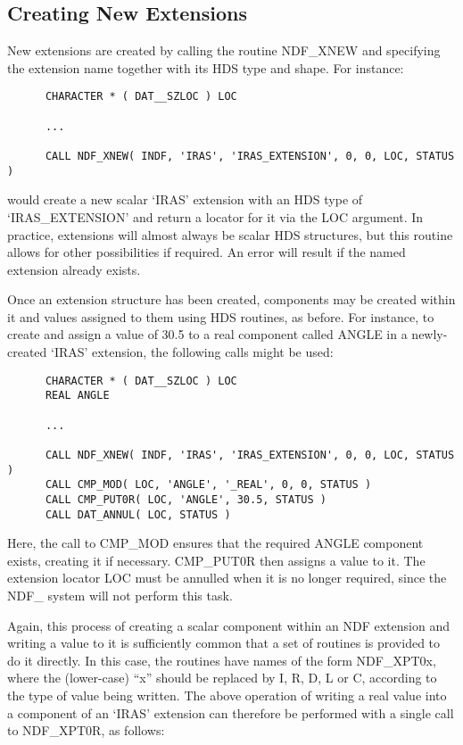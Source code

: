 \documentclass[twoside,11pt]{article}
\newcommand{\htmlref}[2]{#1}
\newcommand{\xref}[3]{#1}
\newcommand{\xlabel}[1]{}
\begin{document}
\subsection{\xlabel{creating_new_extensions}\label{ss:creatingnewextensions}Creating New Extensions}

New extensions are created by calling the routine \htmlref{NDF\_XNEW}{NDF_XNEW} and specifying
the extension name together with its \xref{HDS type and
shape}{sun92}{HDS_objects}.
For instance:

\small
\begin{verbatim}
      CHARACTER * ( DAT__SZLOC ) LOC

      ...

      CALL NDF_XNEW( INDF, 'IRAS', 'IRAS_EXTENSION', 0, 0, LOC, STATUS )
\end{verbatim}
\normalsize

would create a new scalar `IRAS' extension with an HDS type of
`IRAS\_EXTENSION' and return a \xref{locator}{sun92}{using_locators}
for it via the LOC argument.
In practice, extensions will almost always be scalar HDS structures, but
this routine allows for other possibilities if required. 
An error will result if the named extension already exists. 

Once an extension structure has been created, components may be created
within it and values assigned to them using \xref{HDS
routines}{sun92}{alphabetical_list_of_routines}, as before.
For instance, to create and assign a value of 30.5 to a real component
called ANGLE in a newly-created `IRAS' extension, the following calls might
be used: 

\small
\begin{verbatim}
      CHARACTER * ( DAT__SZLOC ) LOC
      REAL ANGLE

      ...

      CALL NDF_XNEW( INDF, 'IRAS', 'IRAS_EXTENSION', 0, 0, LOC, STATUS )
      CALL CMP_MOD( LOC, 'ANGLE', '_REAL', 0, 0, STATUS )
      CALL CMP_PUT0R( LOC, 'ANGLE', 30.5, STATUS )
      CALL DAT_ANNUL( LOC, STATUS )
\end{verbatim}
\normalsize

Here, the call to \xref{CMP\_MOD}{sun92}{CMP_MOD} ensures that the
required ANGLE component exists, creating it if necessary.
\xref{CMP\_PUT0R}{sun92}{CMP_PUT0x} then assigns a value to it. 
The extension locator LOC must be annulled when it is no longer required,
since the NDF\_ system will not perform this task. 

Again, this process of creating a scalar component within an NDF extension
and writing a value to it is sufficiently common that a set of routines is
provided to do it directly. 
In this case, the routines have names of the form \htmlref{NDF\_XPT0x}{NDF_XPT0x}, where the
(lower-case) ``x'' should be replaced by I, R, D, L or C, according to the
type of value being written. 
The above operation of writing a real value into a component of an `IRAS'
extension can therefore be performed with a single call to NDF\_XPT0R, as
follows: 
\end{document}
